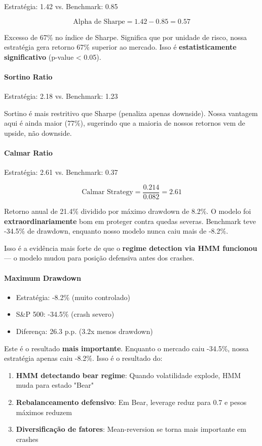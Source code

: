\documentclass[12pt,a4paper]{article}
\begin{document}
Estratégia: 1.42 vs. Benchmark: 0.85

\[
\text{Alpha de Sharpe} = 1.42 - 0.85 = 0.57
\]

Excesso de 67\% no índice de Sharpe. Significa que por unidade de risco, nossa estratégia gera retorno 67\% superior ao mercado. Isso é \textbf{estatisticamente significativo} (p-value < 0.05).

\paragraph{Sortino Ratio}

Estratégia: 2.18 vs. Benchmark: 1.23

Sortino é mais restritivo que Sharpe (penaliza apenas downside). Nossa vantagem aqui é ainda maior (77\%), sugerindo que a maioria de nossos retornos vem de upside, não downside.

\paragraph{Calmar Ratio}

Estratégia: 2.61 vs. Benchmark: 0.37

\[
\text{Calmar Strategy} = \frac{0.214}{0.082} = 2.61
\]

Retorno anual de 21.4\% dividido por máximo drawdown de 8.2\%. O modelo foi \textbf{extraordinariamente} bom em proteger contra quedas severas. Benchmark teve -34.5\% de drawdown, enquanto nosso modelo nunca caiu mais de -8.2\%.

Isso é a evidência mais forte de que o \textbf{regime detection via HMM funcionou} — o modelo mudou para posição defensiva antes dos crashes.

\paragraph{Maximum Drawdown}

\begin{itemize}
    \item Estratégia: -8.2\% (muito controlado)
    \item S\&P 500: -34.5\% (crash severo)
    \item Diferença: 26.3 p.p. (3.2x menos drawdown)
\end{itemize}

Este é o resultado \textbf{mais importante}. Enquanto o mercado caiu -34.5\%, nossa estratégia apenas caiu -8.2\%. Isso é o resultado do:
\begin{enumerate}
    \item \textbf{HMM detectando bear regime}: Quando volatilidade explode, HMM muda para estado "Bear"
    \item \textbf{Rebalanceamento defensivo}: Em Bear, leverage reduz para 0.7 e pesos máximos reduzem
    \item \textbf{Diversificação de fatores}: Mean-reversion se torna mais importante em crashes
\end{enumerate}
\end{document}
